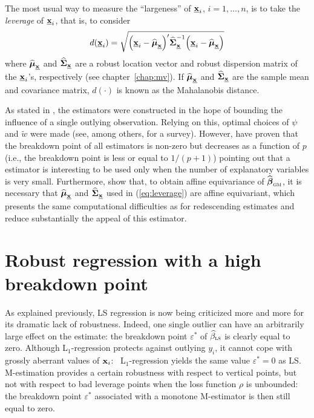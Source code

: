 The most usual way to measure the “largeness” of $\underline{\mathbf x}_{i}$,
$i=1, \dots, n$, is to take the \emph{leverage} of $\underline{\mathbf x}_{i}$,
that is, to consider
%
\begin{equation}
    \label{eq:leverage}
    d(\underline{\stvec{x}}_{i}) = 
    \sqrt{\left(\underline{\stvec{x}}_{i} - \sthat{\boldsymbol\mu}_{\underline{\stvec{x}}}\right)'
    \sthat{\boldsymbol\Sigma}_{\underline{\stvec{x}}}^{-1}
    \left(\underline{\stvec{x}}_{i} - \sthat{\boldsymbol\mu}_{\underline{\stvec{x}}}\right)}
\end{equation}
%
where $\widehat{\boldsymbol\mu}_{\underline{\mathbf x}}$ and
$\widehat{\boldsymbol\Sigma}_{\underline{\mathbf x}}$ are a robust location
vector and robust dispersion matrix of the $\underline{\mathbf x}_{i}$'s,
respectively (see chapter~\ref{chap:mv}). If
$\widehat{\boldsymbol\mu}_{\underline{\mathbf x}}$ and
$\widehat{\boldsymbol\Sigma}_{\underline{\mathbf x}}$ are the sample mean and
covariance matrix, $d(\cdot)$ is known as the Mahalanobis distance.

As stated in \citet{rousseeuw:leroy:1987}, the  estimators were
constructed in the hope of bounding the influence of a single outlying
observation. Relying on this, optimal choices of $\psi$ and $\widetilde{w}$
were made (see, among others, \citealp{Ronchetti:Rousseeuw:1985} for a survey).
However, \citet{Maronna:1979} have proven that the breakdown point of all
 estimators is non-zero but decreases as a function of $p$ (i.e., the
breakdown point is less or equal to $1/(p+1)$) pointing out that a
 estimator is interesting to be used only when the number of
explanatory variables is very small. Furthermore, \citet{maronna:etal:2006}
show that, to obtain affine equivariance of
$\sthat{\boldsymbol\beta}_{\stsc{GM}}$, it is necessary that
$\widehat{\boldsymbol\mu}_{\underline{\mathbf x}}$ and
$\widehat{\boldsymbol\Sigma}_{\underline{\mathbf x}}$ used in (\ref{eq:leverage})
are affine equivariant, which presents the same computational difficulties as
for redescending  estimates and reduce substantially the appeal of this
estimator.

\section{Robust regression with a high breakdown point}

As explained previously, LS regression is now being criticized more and more
for its dramatic lack of robustness. Indeed, one single outlier can have an
arbitrarily large effect on the estimate: the breakdown point $\varepsilon
^{\ast}$ of $\sthat{\beta}_{\stsc{LS}}$ is clearly equal to zero. Although
L$_{1}$-regression protects against outlying $y_{i}$, it cannot cope with
grossly aberrant values of $\mathbf x_{i}$: \ L$_{1}$-regression yields the
same value $\varepsilon^{\ast}=0$ as LS. M-estimation provides a certain
robustness with respect to vertical points, but not with respect to bad
leverage points when the loss function $\rho$ is unbounded: the breakdown
point $\varepsilon^{\ast}$ associated with a monotone M-estimator is then
still equal to zero.


